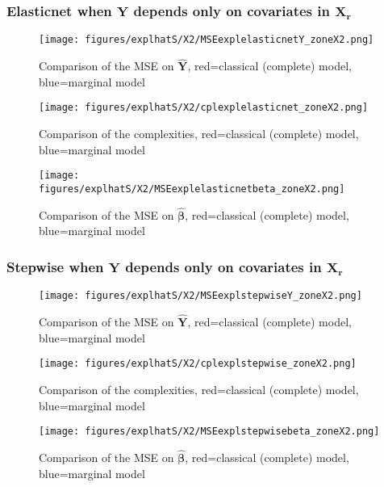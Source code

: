 \documentclass[12pt,a4paper]{report}
\begin{document}
\subsubsection{Elasticnet when $\boldsymbol{Y}$ depends only on covariates in $\boldsymbol{X_r}$}

	\begin{figure}[h!]
	\centering
		  \texttt{[image: figures/explhatS/X2/MSEexplelasticnetY\_zoneX2.png]}
		\caption{Comparison of the MSE on $\hat{\boldsymbol{Y}}$, red=classical (complete) model, blue=marginal model}\label{MSEexplelasticnetY_zoneX2}
	\end{figure}
	\begin{figure}[h!]
	\centering
		  \texttt{[image: figures/explhatS/X2/cplexplelasticnet\_zoneX2.png]}
		\caption{Comparison of the complexities, red=classical (complete) model, blue=marginal model}\label{cplexplelasticnet_zoneX2}
	\end{figure}
	\begin{figure}[h!]
	\centering
		  \texttt{[image: figures/explhatS/X2/MSEexplelasticnetbeta\_zoneX2.png]}
		\caption{Comparison of the MSE on $\hat{\boldsymbol{\beta}}$, red=classical (complete) model, blue=marginal model}\label{MSEexplelasticnetbeta_zoneX2}
	\end{figure}
	\FloatBarrier
\newpage
\subsubsection{Stepwise when $\boldsymbol{Y}$ depends only on covariates in $\boldsymbol{X_r}$}

	\begin{figure}[h!]
	\centering
		  \texttt{[image: figures/explhatS/X2/MSEexplstepwiseY\_zoneX2.png]}
		\caption{Comparison of the MSE on $\hat{\boldsymbol{Y}}$, red=classical (complete) model, blue=marginal model}\label{MSEexplstepwiseY_zoneX2}
	\end{figure}
	\begin{figure}[h!]
	\centering
		  \texttt{[image: figures/explhatS/X2/cplexplstepwise\_zoneX2.png]}
		\caption{Comparison of the complexities, red=classical (complete) model, blue=marginal model}\label{cplexplstepwise_zoneX2}
	\end{figure}
	\begin{figure}[h!]
	\centering
		  \texttt{[image: figures/explhatS/X2/MSEexplstepwisebeta\_zoneX2.png]}
		\caption{Comparison of the MSE on $\hat{\boldsymbol{\beta}}$, red=classical (complete) model, blue=marginal model}\label{MSEexplstepwisebeta_zoneX2}
	\end{figure}
	\FloatBarrier
\newpage
\end{document}
